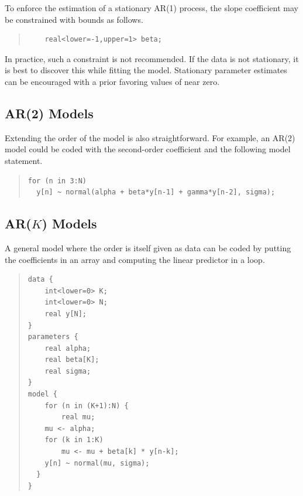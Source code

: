 To enforce the estimation of a stationary AR(1) process, the slope
coefficient  may be constrained with bounds as follows.
%
\begin{quote}
\begin{Verbatim}
    real<lower=-1,upper=1> beta;
\end{Verbatim}
\end{quote}
%
In practice, such a constraint is not recommended.  If the data is not
stationary, it is best to discover this while fitting the model.
Stationary parameter estimates can be encouraged with a prior favoring
values of  near zero.


\subsection{AR(2) Models}

Extending the order of the model is also straightforward.  For
example, an AR(2) model could be coded with the second-order
coefficient  and the following model statement.
%
\begin{quote}
\begin{Verbatim}
for (n in 3:N)
  y[n] ~ normal(alpha + beta*y[n-1] + gamma*y[n-2], sigma);
\end{Verbatim}
\end{quote}


\subsection{AR($K$) Models}

A general model where the order is itself given as data can be coded
by putting the coefficients in an array and computing the linear
predictor in a loop.
%
\begin{quote}
\begin{Verbatim}
data {
    int<lower=0> K;
    int<lower=0> N;
    real y[N];
}
parameters {
    real alpha;
    real beta[K];
    real sigma;
}
model {
    for (n in (K+1):N) {
        real mu;
    mu <- alpha;
    for (k in 1:K)
        mu <- mu + beta[k] * y[n-k];
    y[n] ~ normal(mu, sigma);
  }
}
\end{Verbatim}
\end{quote}




